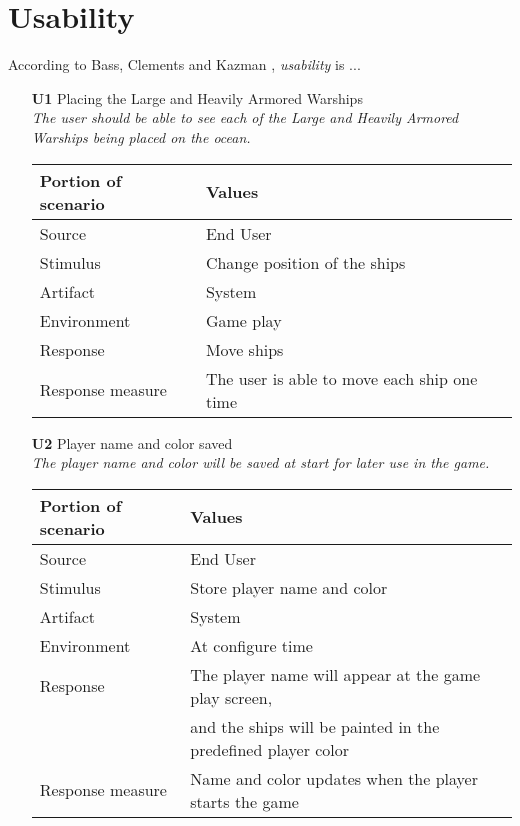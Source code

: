 \section{Usability}
According to Bass, Clements and Kazman \cite{pensum}, \emph{usability} is ...
    \begin{itemize}
        \item[\textbf{U1}] Placing the Large and Heavily Armored Warships \\
        \textit{\small{The user should be able to see each of the Large and Heavily Armored Warships being placed on the ocean.}}
        
        \begin{tabular}{| l | l |}
            \hline
            \rowcolor[gray]{0.8}
            \textbf{Portion of scenario} & \textbf{Values} \\
            \hline
            Source & End User \\
            Stimulus & Change position of the ships \\
            Artifact & System \\
            Environment & Game play \\
            Response & Move ships  \\
            Response measure & The user is able to move each ship one time \\
            \hline
        \end{tabular}

        \item[\textbf{U2}] Player name and color saved \\
        \textit{\small{The player name and color will be saved at start for later use in the game.}}
        
        \begin{tabular}{| l | l |}
            \hline
            \rowcolor[gray]{0.8}
            \textbf{Portion of scenario} & \textbf{Values} \\
            \hline
            Source & End User \\
            Stimulus & Store player name and color \\
            Artifact & System \\
            Environment & At configure time \\
            Response & The player name will appear at the game play screen, \\
             & and the ships will be painted in the predefined player color  \\
            Response measure & Name and color updates when the player starts the game \\
            \hline
        \end{tabular}


\end{itemize}
